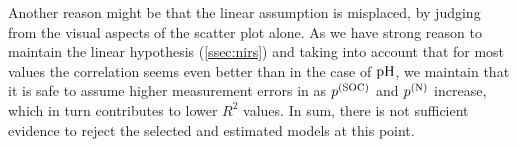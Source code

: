 		Another reason might be that the linear assumption is misplaced, by judging from the visual aspects of the scatter plot alone.
		As we have strong reason to maintain the linear hypothesis (\ref{ssec:nirs}) and taking into account that for most values the correlation seems even better than in the case of $\mathrm{pH}$, we maintain that it is safe to assume higher measurement errors in as $p^{\mathrm{(SOC)}}$ and $p^{\mathrm{(N)}}$ increase, which in turn contributes to lower $R^2$ values.
		In sum, there is not sufficient evidence to reject the selected and estimated models at this point.
		

